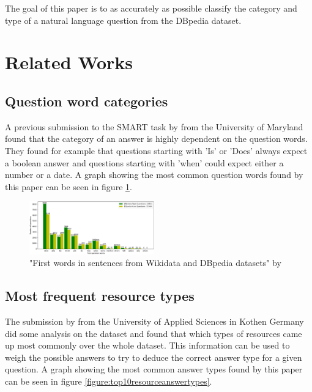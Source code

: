 \documentclass[sigconf]{acmart}
\begin{document}
The goal of this paper is to as accurately as possible classify the category and type of a natural language question from the DBpedia dataset.



\section{Related Works}

\subsection{Question word categories}
A previous submission to the \gls{SMART} task by \citet{Maryland:qwords} from the University of Maryland found that the category of an answer is highly dependent on the question words. They found for example that questions starting with 'Is' or 'Does' always expect a boolean answer and questions starting with 'when' could expect either a number or a date\cite{Maryland:qwords}. A graph showing the most common question words found by this paper can be seen in figure \ref{figure:firstquestionwords}. 

\begin{figure}[h]
    \includegraphics[width=0.48\textwidth]{figures/firstQuestionWords.png}
    \caption{"First words in sentences from Wikidata and DBpedia datasets" by \citet{Maryland:qwords}}
    \label{figure:firstquestionwords}
\end{figure}

\subsection{Most frequent resource types}
The submission by \citet{Kothen:analysis} from the University of Applied Sciences in Kothen Germany did some analysis on the dataset and found that which types of resources came up most commonly over the whole dataset. This information can be used to weigh the possible answers to try to deduce the correct answer type for a given question\cite{Kothen:analysis}. A graph showing the most common answer types found by this paper can be seen in figure \ref{figure:top10resourceanswertypes}.
\end{document}
